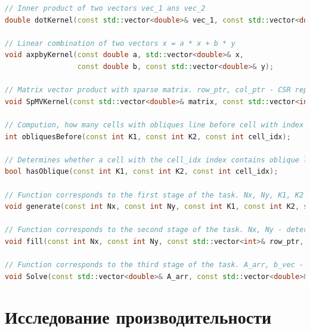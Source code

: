 	\begin{lstlisting}[numbersep=10pt, language=C++, caption=\textbf{Реализованные функции}]
// Inner product of two vectors vec_1 ans vec_2
double dotKernel(const std::vector<double>& vec_1, const std::vector<double>& vec_2);

// Linear combination of two vectors x = a * x + b * y
void axpbyKernel(const double a, std::vector<double>& x,
	             const double b, const std::vector<double>& y);

// Matrix vector product with sparse matrix. row_ptr, col_ptr - CSR representation, res = Matrix * vec
void SpMVKernel(const std::vector<double>& matrix, const std::vector<int>& row_ptr, const std::vector<int>& col_ptr, const std::vector<double>& vec, std::vector<double>& res);

// Compution, how many cells with obliques line before cell with index cell_idx, K1, K2 - parameters that determine the distribution of oblique lines
int obliquesBefore(const int K1, const int K2, const int cell_idx);

// Determines whether a cell with the cell_idx index contains oblique line,  K1, K2 - parameters that determine the distribution of oblique lines
bool hasOblique(const int K1, const int K2, const int cell_idx);

// Function corresponds to the first stage of the task. Nx, Ny, K1, K2 - determine the configuration of a two-dimensional grid, row_ptr, col_ptr - CSR representation
void generate(const int Nx, const int Ny, const int K1, const int K2, std::vector<int>& row_ptr, std::vector<int>& col_ptr);

// Function corresponds to the second stage of the task. Nx, Ny - determine grid size, row_ptr, col_ptr - CSR representation, A_arr, b_vec - fillable matrix and vector
void fill(const int Nx, const int Ny, const std::vector<int>& row_ptr, const std::vector<int>& col_ptr, std::vector<double>& A_arr, std::vector<double>& b_vec);

// Function corresponds to the third stage of the task. A_arr, b_vec - initial data for solving systems of linear equations, row_ptr, col_ptr - CSR representation, x_vec - equations solution, TOL - relative error of the solution
void Solve(const std::vector<double>& A_arr, const std::vector<double>& b_vec, const std::vector<int>& row_ptr, const std::vector<int>& col_ptr, std::vector<double>& x_vec, const double TOL = 1e-4);
	\end{lstlisting}
\section{Исследование производительности}
